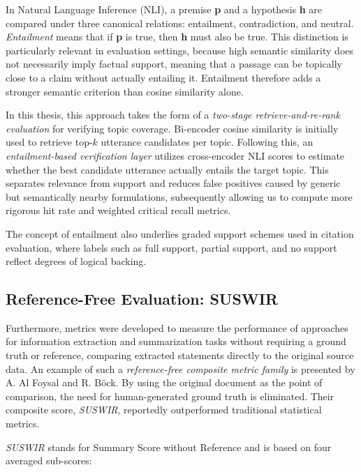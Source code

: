 In Natural Language Inference (NLI), a premise \textbf{p} and a hypothesis \textbf{h} are compared under three canonical relations: entailment, contradiction, and neutral. 
\textit{Entailment} means that if \textbf{p} is true, then \textbf{h} must also be true. 
This distinction is particularly relevant in evaluation settings, because high semantic similarity does not necessarily imply factual support, meaning that a passage can be topically close to a claim without actually entailing it.
Entailment therefore adds a stronger semantic criterion than cosine similarity alone.

In this thesis, this approach takes the form of a \textit{two-stage retrieve-and-re-rank evaluation} for verifying topic coverage. Bi-encoder cosine similarity is initially used to retrieve top-$k$ utterance candidates per topic. 
Following this, an \textit{entailment-based verification layer} utilizes cross-encoder NLI scores to estimate whether the best candidate utterance actually entails the target topic. 
This separates relevance from support and reduces false positives caused by generic but semantically nearby formulations, subsequently allowing us to compute more rigorous hit rate and weighted critical recall metrics.

The concept of entailment also underlies graded support schemes used in citation evaluation, where labels such as full support, partial support, and no support reflect degrees of logical backing.

\subsection{Reference-Free Evaluation: SUSWIR}

Furthermore, metrics were developed to measure the performance of approaches for information extraction and summarization tasks without requiring a ground truth or reference, comparing extracted statements directly to the original source data. An example of such a \textit{reference-free composite metric family} is presented by A. Al Foysal and R. Böck\cite{foysalWhoNeedsExternal2023}. By using the original document as the point of comparison, the need for human-generated ground truth is eliminated. Their composite score, \textit{SUSWIR}, reportedly outperformed traditional statistical metrics.

\textit{SUSWIR} stands for Summary Score without Reference and is based on four averaged sub-scores:

